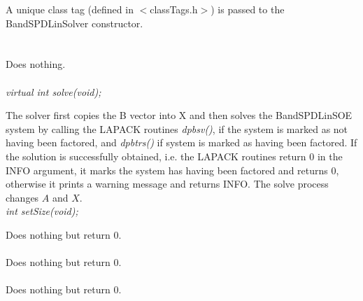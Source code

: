 A unique class tag (defined in $<$classTags.h$>$) is passed to the
BandSPDLinSolver constructor. \\


 \\
\\ 
Does nothing. \\

  \\
{\em virtual int solve(void);} 

The solver first copies the B vector into X and then solves the
BandSPDLinSOE system by calling the LAPACK routines {\em 
dpbsv()}, if the system is marked as not having been factored,
and {\em dpbtrs()} if system is marked as having been factored. 
If the solution is successfully obtained, i.e. the LAPACK routines
return $0$ in the INFO argument, it marks the system has having been 
factored and returns $0$, otherwise it prints a warning message and
returns INFO. The solve process changes $A$ and $X$. \\   


{\em int setSize(void);} 

Does nothing but return $0$. \\

 \\ 
Does nothing but return $0$. \\

 \\ 
Does nothing but return $0$. \\



